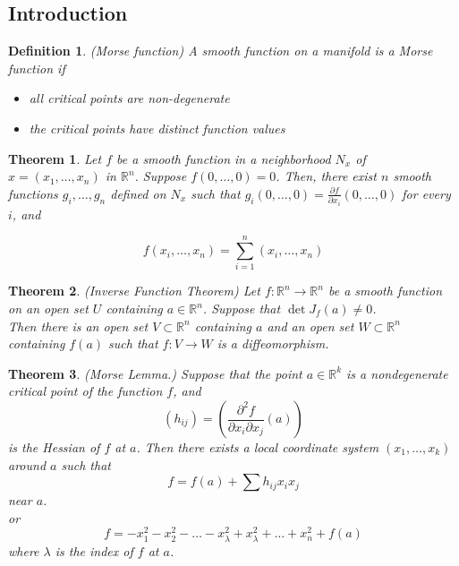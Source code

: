 \documentclass[]{article}
\newtheorem{theorem}{Theorem}
\newtheorem{definition}{Definition}
\begin{document}
\subsection{Introduction}

\begin{definition}(Morse function)
A smooth function on a manifold is a Morse function if 
\begin{itemize}
	\item all critical points are non-degenerate
	\item the critical points have distinct function values
\end{itemize}
\end{definition}

\begin{theorem}
        Let $f$ be a smooth function in a neighborhood 
    $N_x$ of $x=(x_1,\ldots,x_n)$ in $\mathbb{R}^n$. Suppose $f(0,\ldots,0)=0$. Then, 
    there exist $n$ smooth functions $g_i,\ldots,g_n$ defined on $N_x$ such that $g_i(0,\ldots,0)=\frac{\partial f}{\partial x_i}(0,\ldots,0)$
    for every $i$, and

    $$
        f(x_i,\ldots,x_n)=\sum_{i=1}^{n}{(x_i,\ldots,x_n)}
    $$
\end{theorem}
\begin{theorem}(Inverse Function Theorem)
        Let $f:\mathbb{R}^n\to \mathbb{R}^n$ be a smooth function on an open set $U$
        containing $a\in\mathbb{R}^n$. Suppose that $\det J_f(a)\not = 0$.
        \\Then there is an open set $V \subset \mathbb{R}^n$ containing $a$ and an open
        set $W\subset \mathbb{R}^n$ containing $f(a)$ such that $f:V\to W$ is a 
        diffeomorphism. 
\end{theorem}
\begin{theorem}(Morse Lemma.)
        Suppose that the point $a \in \mathbb{R}^k$ is a nondegenerate
        critical point of the function $f$, and
        $$
            (h_{ij})= \left(  \frac{\partial^2f}{\partial x_i \partial x_j} (a) \right)
        $$
        is the Hessian of $f$ at $a$. Then there exists a local coordinate system $(x_1,\ldots,x_k)$ around $a$ such that
        $$
            f=f(a)+\sum{h_{ij}x_ix_j}
        $$
        near $a$.
        \\
        or
        $$
            f=-x_1^2-x_2^2-\ldots-x_\lambda^2+x_\lambda^2+\ldots+x_n^2+f(a)
        $$
        where $\lambda$ is the index of $f$ at $a$.
\end{theorem}
\end{document}
